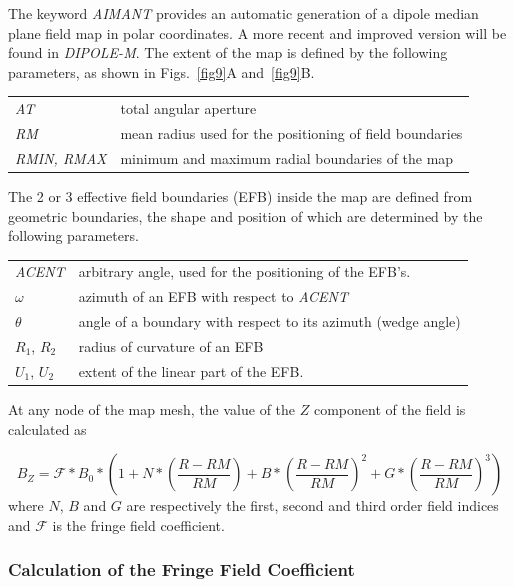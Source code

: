 The keyword \textsl{AIMANT} provides an automatic
generation of a dipole median plane field map in polar coordinates. A more recent and improved version will be 
found in \textsl{DIPOLE-M}. The extent of the map is defined by the 
following parameters, as shown in Figs.~\ref{fig9}A and~\ref{fig9}B. 

 \begin{tabular}{>{\sl}l!{:}l}
	 AT &  total angular aperture\\
	 RM & mean radius used for the positioning of field boundaries\\
	 RMIN, RMAX
	    &  minimum and maximum radial boundaries of the map 
 \end{tabular}
\bigskip

\noindent The 2 or 3 effective field boundaries (EFB) inside the map are
defined from  geometric boundaries, the shape and position of which are determined by the 
following parameters.  


\begin{tabular}{l!{:}l}
	 \textsl{ACENT} 
	    & arbitrary  angle, used for the positioning of the EFB's. \\
	$\omega$ &  azimuth of an EFB with respect to  \textsl{ACENT}\\
	$\theta$ & angle of a boundary with respect to its azimuth (wedge angle)\\ 
	$R_1$, $R_2$  &  radius of curvature of an EFB\\
	$U_1$, $U_2$  &  extent of the linear part of the EFB. 
\end{tabular}
\bigskip

\noindent At  any node  of the map mesh, the value of the $Z$ 
component of the field is calculated as 

 \begin{equation}
	 B_Z =  \mathcal{F} \ast  B_0 \ast  
	      \left(1+N \ast  
	           \left( \frac{R-RM }{ RM}\right) 
	           + B \ast  \left(\frac{R-RM }{ RM} \right)^2 
	           + G \ast  \left(\frac{R-RM }{ RM} \right)^3 
	      \right) 
 	\label{eq4-4-1}
 \end{equation}
%
 where  $ N$, $B $ and $ G $ are  respectively  the first, second and
third order field indices and $ \mathcal{F}$ is the fringe field 
coefficient. 


\subsubsection*{Calculation of the Fringe Field Coefficient} 

